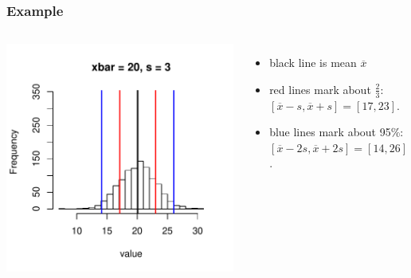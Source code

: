 \documentclass[handout]{beamer}
\begin{document}
\begin{frame}[fragile]
\frametitle{Example}

\begin{columns}
\begin{center}
\includegraphics[width=\textwidth]{figure/spread3.pdf}
\end{center}
\begin{itemize}
\item black line is mean $\overline{x}$
\item red lines mark about $\frac{2}{3}$:  $[\overline{x} - s, \overline{x} + s] = [17, 23]$.  
\item blue lines mark about 95\%: $[\overline{x} - 2s, \overline{x} + 2s] = [14, 26]$.
\end{itemize}
\end{columns}

\end{frame}
\end{document}
